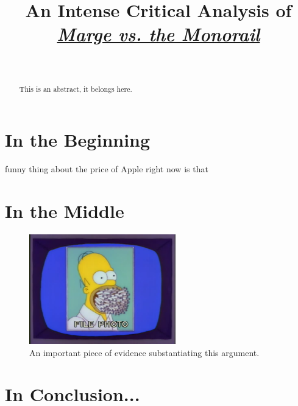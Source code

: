 \documentclass[10pt,journal,letterpaper,final]{IEEEtran}
\begin{document}
\title{An Intense Critical Analysis of \textit{\href{https://en.wikipedia.org/wiki/Marge_vs._the_Monorail}{Marge vs. the Monorail}}}

\author{
	 \\
}

\maketitle

\begin{abstract}
This is an abstract, it belongs here. \lipsum[1]
\end{abstract}

\section{In the Beginning}

 funny thing about the price of Apple \cite{black-scholes} right now \cite{didion} is that \lipsum[2]

\section{In the Middle}

\lipsum[3]

\begin{figure}
\centering
\includegraphics[width=2.5in]{figure_1}
\caption{An important piece of evidence substantiating this argument.}
\label{figure_1}
\end{figure}

\section{In Conclusion...}

\lipsum[4]


\printbibliography

\end{document}
